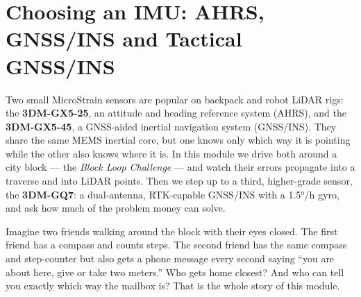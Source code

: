 \chapter{Choosing an IMU: AHRS, GNSS/INS and Tactical GNSS/INS}

Two small MicroStrain sensors are popular on backpack and robot LiDAR rigs: the \textbf{3DM-GX5-25}, an attitude and heading reference system (AHRS), and the \textbf{3DM-GX5-45}, a GNSS-aided inertial navigation system (GNSS/INS). They share the same MEMS inertial core, but one knows only which way it is pointing while the other also knows where it is. In this module we drive both around a city block --- the \emph{Block Loop Challenge} --- and watch their errors propagate into a traverse and into LiDAR points. Then we step up to a third, higher-grade sensor, the \textbf{3DM-GQ7}: a dual-antenna, RTK-capable GNSS/INS with a 1.5°/h gyro, and ask how much of the problem money can solve.

\begin{kid}
Imagine two friends walking around the block with their eyes closed. The first friend has a compass and counts steps. The second friend has the same compass and step-counter but also gets a phone message every second saying ``you are about here, give or take two meters.'' Who gets home closest? And who can tell you exactly which way the mailbox is? That is the whole story of this module.
\end{kid}

